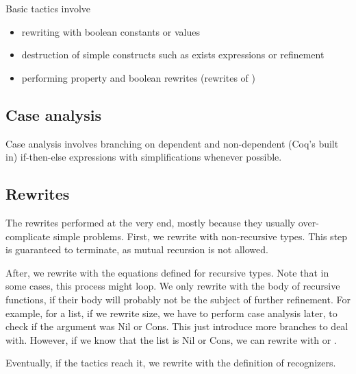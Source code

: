 Basic tactics involve
\begin{itemize}
	\item rewriting with boolean constants or values
	\item destruction of simple constructs such as exists expressions or refinement
	\item performing property and boolean rewrites (rewrites of )
\end{itemize}

\subsection{Case analysis}

Case analysis involves branching on dependent and non-dependent (Coq's built in) if-then-else expressions with simplifications whenever possible.

\subsection{Rewrites}

The rewrites performed at the very end, mostly because they usually over-complicate simple problems. First, we rewrite with non-recursive types. This step is guaranteed to terminate, as mutual recursion is not allowed.

After, we rewrite with the equations defined for recursive types. Note that in some cases, this process might loop. We only rewrite with the body of recursive functions, if their body will probably not be the subject of further refinement. For example, for a list, if we rewrite size, we have to perform case analysis later, to check if the argument was Nil or Cons. This just introduce more branches to deal with. However, if we know that the list is Nil or Cons, we can rewrite with  or .

Eventually, if the tactics reach it, we rewrite with the definition of recognizers.